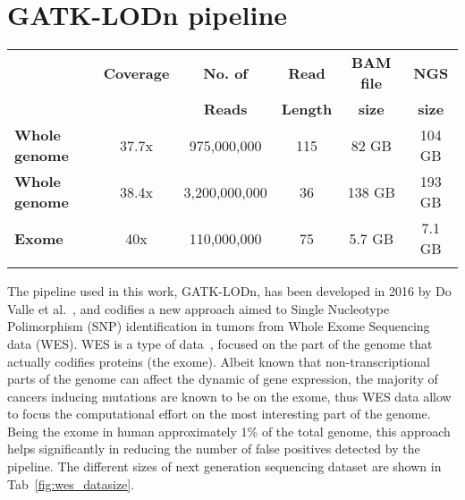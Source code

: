 \documentclass{standalone}
\begin{document}
\section*{GATK-LODn pipeline}

\begin{table*}
\centering
\begin{tabular}{lccccc}
\hline \rowcolor{darkgrayrow}
 & \textbf{Coverage} & \textbf{No. of} & \textbf{Read}   & \textbf{BAM file} & \textbf{NGS}\\
\rowcolor{darkgrayrow}
 &                   & \textbf{Reads}  & \textbf{Length} & \textbf{size}     & \textbf{size}\\
\hline
\textbf{Whole genome} & 37.7x & 975,000,000   & 115 & 82 GB  & 104 GB \\

\textbf{Whole genome} & 38.4x & 3,200,000,000 & 36  & 138 GB & 193 GB\\

\textbf{Exome}        & 40x   & 110,000,000   & 75  & 5.7 GB & 7.1 GB \\
\hline\\
\end{tabular}
\caption{Typical dataset size for a single patient of different types of next generation sequencing.
BAM file size refers to the size of the binary file containing the reads from the machine.}
\label{fig:wes_datasize}
\end{table*}

The pipeline used in this work, GATK-LODn, has been developed in 2016 by Do Valle et al.~\cite{DoValle2016}, and codifies a new approach aimed to Single Nucleotype Polimorphism (SNP) identification in tumors from Whole Exome Sequencing data (WES).
WES is a type of  data~\cite{Zwolak2008, Behjati2013, Shendure2008}, focused on the part of the genome that actually codifies proteins (the exome).
Albeit known that non-transcriptional parts of the genome can affect the dynamic of gene expression, the majority of cancers inducing mutations are known to be on the exome, thus WES data allow to focus the computational effort on the most interesting part of the genome.
Being the exome in human approximately 1\% of the total genome, this approach helps significantly in reducing the number of false positives detected by the pipeline.
The different sizes of next generation sequencing dataset are shown in Tab~\ref{fig:wes_datasize}.
\end{document}
